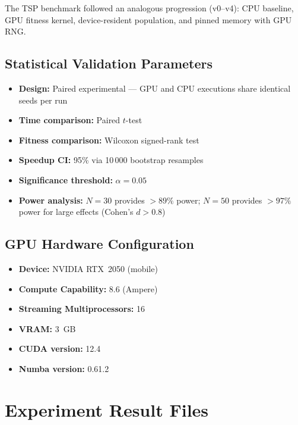 \documentclass[a4paper,14pt]{extarticle}
\begin{document}
The TSP benchmark followed an analogous progression (v0--v4): CPU baseline, GPU fitness
kernel, device-resident population, and pinned memory with GPU RNG.

\subsection{Statistical Validation Parameters}

\begin{itemize}
  \item \textbf{Design:} Paired experimental --- GPU and CPU executions share identical seeds
        per run
  \item \textbf{Time comparison:} Paired $t$-test
  \item \textbf{Fitness comparison:} Wilcoxon signed-rank test
  \item \textbf{Speedup CI:} 95\% via 10\,000 bootstrap resamples
  \item \textbf{Significance threshold:} $\alpha = 0.05$
  \item \textbf{Power analysis:} $N = 30$ provides $> 89\%$ power; $N = 50$ provides
        $> 97\%$ power for large effects (Cohen's $d > 0.8$)~\cite{cohen1988power}
\end{itemize}

\subsection{GPU Hardware Configuration}

\begin{itemize}
  \item \textbf{Device:} NVIDIA RTX~2050 (mobile)
  \item \textbf{Compute Capability:} 8.6 (Ampere)
  \item \textbf{Streaming Multiprocessors:} 16
  \item \textbf{VRAM:} 3~GB
  \item \textbf{CUDA version:} 12.4
  \item \textbf{Numba version:} 0.61.2
\end{itemize}


\section{Experiment Result Files}
\end{document}
